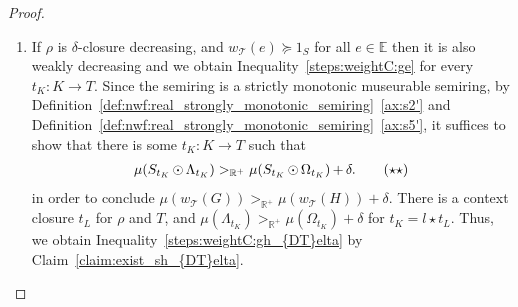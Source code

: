 \begin{proof}
\begin{enumerate}
        \item
            If $\rho$ is $\delta$-closure decreasing, and $w_\mathcal{T}(e) \mathop{\succeq} 1_S$ for all $e \mathop{\in} \mathbb{E}$ then it is also weakly decreasing and we obtain Inequality~\eqref{steps:weightC:ge} for every $t_K : K \mathop{\to} T$.
            Since the semiring is a strictly monotonic museurable semiring,  by Definition~\ref{def:nwf:real_strongly_monotonic_semiring}~\eqref{ax:s2'} and Definition~\ref{def:nwf:real_strongly_monotonic_semiring}~\eqref{ax:s5'}, it suffices to show that there is some $t_K : K \mathop{\to} T$ such that 
            \begin{align}
                \mu(S_{t_K} \mathop{\odot} \Lambda_{t_K}) >_{\mathbb{R}^+} \mu(S_{t_K} \mathop{\odot} \Omega_{t_K})\mathop{+}
                \delta.
              \tag{$\star\star$}\label{steps:weightC:gh_{DT}elta}
            \end{align}
            in order to conclude $ \mu(w_\mathcal{T}(G)) >_{\mathbb{R}^+} \mu(w_\mathcal{T}(H))\mathop{+}\delta$.
            There is a context closure $t_L$ for $\rho$ and $T$, and
            $\mu(\Lambda_{t_K}) >_{\mathbb{R}^+} \mu(\Omega_{t_K})\mathop{+}\delta$
            for $t_K \mathop{=} l \mathop{\star} t_L$. Thus, we obtain Inequality~\eqref{steps:weightC:gh_{DT}elta} by Claim~\ref{claim:exist_sh_{DT}elta}.
    \end{enumerate}
\end{proof}  